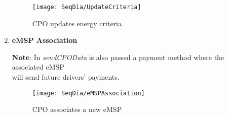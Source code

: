 \begin{enumerate}
        \begin{figure}[H]
            \begin{center}
            \texttt{[image: SeqDia/UpdateCriteria]}
            \caption{CPO updates energy criteria}
            \label{fig:UpdateCriteria}
            \end{center}
        \end{figure}
        \newpage
        \item \textbf{eMSP Association}
        \begin{tabbing}
            \textbf{Note}: \= In \textit{sendCPOData} is also passed a payment method where the associated eMSP\\
            \> will send future drivers' payments.
        \end{tabbing}
        \begin{figure}[H]
            \begin{center}
            \texttt{[image: SeqDia/eMSPAssociation]}
            \caption{CPO associates a new eMSP}
            \label{fig:eMSPAssociation}
            \end{center}
        \end{figure}
\end{enumerate}
\restoregeometry
